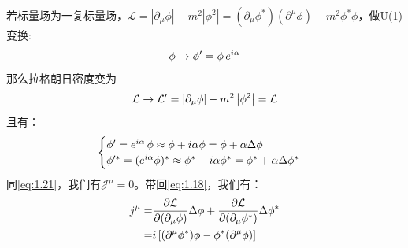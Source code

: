 \documentclass[../main.tex]{subfiles}
\begin{document}
\begin{example}
    若标量场为一复标量场，$\mathcal{L} = \left| \partial_{\mu}\phi \right| - m^2\left| \phi^2 \right| = (\partial_{\mu}\phi^*)(\partial^{\mu}\phi) - m^2 \phi^*\phi$，做U(1)变换:
    \begin{equation}
        \phi \rightarrow \phi' = \phi \, e^{i\alpha} \notag
    \end{equation}
    那么拉格朗日密度变为
    \begin{equation}
        \mathcal{L} \rightarrow \mathcal{L}' = \left| \partial_{\mu}\phi \right| - m^2\left| \phi^2 \right| = \mathcal{L} \notag
    \end{equation}
    且有：
    \begin{equation}
        \begin{cases}
            \phi' = e^{i\alpha}\,\phi \approx \phi + i\alpha \phi = \phi + \alpha \Delta \phi \notag \\
            \phi'^{*} = (e^{i\alpha} \phi)^* \approx \phi^* - i\alpha \phi^* = \phi^* + \alpha \Delta \phi^*  \\ 
        \end{cases}
    \end{equation}
    同\eqref{eq:1.21}，我们有$\mathcal{J}^{\mu} = 0$。带回\eqref{eq:1.18}，我们有：
    \begin{align}
        j^{\mu} = & \frac{\partial \mathcal{L}}{\partial(\partial_{\mu}\phi)} \Delta\phi + \frac{\partial \mathcal{L}}{\partial(\partial_{\mu}\phi^*)} \Delta\phi^* \notag \\
                = & i \left[ (\partial^{\mu}\phi^*)\phi - \phi^*(\partial^{\mu} \phi) \right] 
    \end{align}
\end{example}
\end{document}
